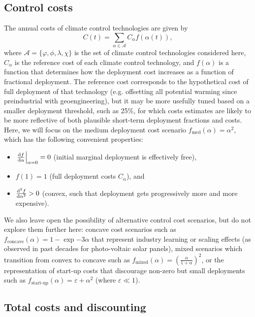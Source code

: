 \documentclass{article}
\begin{document}
\subsection{Control costs}

The annual costs of climate control technologies are given by
\begin{equation}
    C(t) = \sum_{\alpha \in \mathcal{A}} C_{\alpha} f(\alpha(t)),
\end{equation}
where $\mathcal{A} = \{ \varphi, \phi, \lambda, \chi \}$ is the set of climate control technologies considered here, $C_{\alpha}$ is the reference cost of each climate control technology, and $f(\alpha)$ is a function that determines how the deployment cost increases as a function of fractional deployment. The reference cost corresponds to the hypothetical cost of full deployment of that technology (e.g. offsetting all potential warming since preindustrial with geoengineering), but it may be more usefully tuned based on a smaller deployment threshold, such as 25\%, for which costs estimates are likely to be more reflective of both plausible short-term deployment fractions and costs. Here, we will focus on the medium deployment cost scenario $f_{\text{med}}(\alpha) = \alpha^{2}$, which has the following convenient properties: 
\begin{itemize}
    \item $\left. \dv{f}{\alpha}\right|_{\alpha=0} = 0$ (initial marginal deployment is effectively free),
    \item $f(1) = 1$ (full deployment costs $C_{\alpha}$), and
    \item $\dv[2]{f}{\alpha} > 0$ (convex, such that deployment gets progressively more and more expensive).
\end{itemize}
We also leave open the possibility of alternative control cost scenarios, but do not explore them further here: concave cost scenarios such as $f_{\text{concave}}(\alpha) = 1-\exp{-3\alpha}$ that represent industry learning or scaling effects (as observed in past decades for photo-voltaic solar panels), mixed scenarios which transition from convex to concave such as $f_{\text{mixed}}(\alpha) = 
\left( \frac{\alpha}{1 + \alpha} \right)^{2}$, or the representation of start-up costs that discourage non-zero but small deployments such as $f_{\text{start-up}}(\alpha) = \varepsilon +  \alpha^{2}$ (where $\varepsilon \ll 1$).

\subsection{Total costs and discounting}
\end{document}
